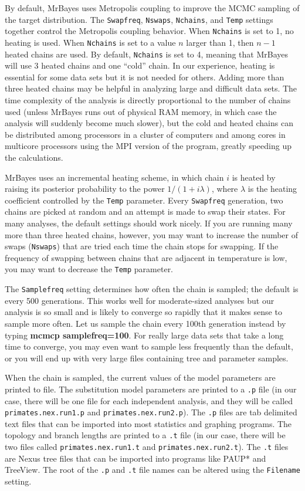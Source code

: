 \documentclass[12pt]{book}
\begin{document}
By default, MrBayes uses Metropolis coupling to improve the MCMC sampling of the target
distribution. The \texttt{Swapfreq}, \texttt{Nswaps}, \texttt{Nchains}, and \texttt{Temp} settings
together control the Metropolis coupling behavior. When \texttt{Nchains} is set to 1, no heating is
used. When \texttt{Nchains} is set to a value $n$ larger than 1, then $n - 1$ heated chains are
used. By default, \texttt{Nchains} is set to 4, meaning that MrBayes will use 3 heated chains and
one ``cold'' chain. In our experience, heating is essential for some data sets but it is not needed
for others. Adding more than three heated chains may be helpful in analyzing large and difficult
data sets. The time complexity of the analysis is directly proportional to the number of chains
used (unless MrBayes runs out of physical RAM memory, in which case the analysis will suddenly
become much slower), but the cold and heated chains can be distributed among processors in a
cluster of computers and among cores in multicore processors using the MPI version of the program,
greatly speeding up the calculations.

MrBayes uses an incremental heating scheme, in which chain $i$ is heated by raising its posterior
probability to the power $1/ (1 + i\lambda)$, where $\lambda$ is the heating coefficient controlled
by the \texttt{Temp} parameter. Every \texttt{Swapfreq} generation, two chains are picked at random
and an attempt is made to swap their states. For many analyses, the default settings should work
nicely. If you are running many more than three heated chains, however, you may want to increase
the number of swaps (\texttt{Nswaps}) that are tried each time the chain stops for swapping. If the
frequency of swapping between chains that are adjacent in temperature is low, you may want to
decrease the \texttt{Temp} parameter.

The \texttt{Samplefreq} setting determines how often the chain is sampled; the default is every 500
generations. This works well for moderate-sized analyses but our analysis is so small and is likely
to converge so rapidly that it makes sense to sample more often. Let us sample the chain every
100th generation instead by typing \textbf{mcmcp samplefreq=100}. For really large data sets that
take a long time to converge, you may even want to sample less frequently than the default, or you
will end up with very large files containing tree and parameter samples.

When the chain is sampled, the current values of the model parameters are printed to file. The
substitution model parameters are printed to a \texttt{.p} file (in our case, there will be one
file for each independent analysis, and they will be called \texttt{primates.nex.run1.p} and
\texttt{primates.nex.run2.p}).  The \texttt{.p} files are tab delimited text files that can be
imported into most statistics and graphing programs. The topology and branch lengths are printed to
a \texttt{.t} file (in our case, there will be two files called \texttt{primates.nex.run1.t} and
\texttt{primates.nex.run2.t}). The \texttt{.t} files are Nexus tree files that can be imported into
programs like PAUP* and TreeView. The root of the \texttt{.p} and \texttt{.t} file names can be
altered using the \texttt{Filename} setting.
\end{document}
